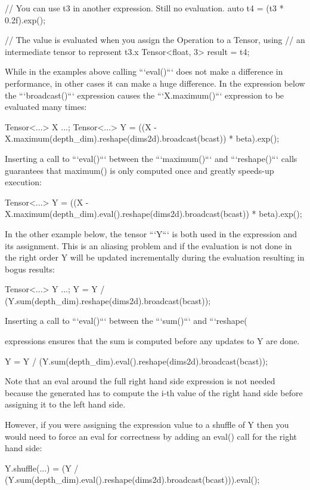 \begin{DoxyCode}
    // You can use t3 in another expression.  Still no evaluation.
    auto t4 = (t3 * 0.2f).exp();

    // The value is evaluated when you assign the Operation to a Tensor, using
    // an intermediate tensor to represent t3.x
    Tensor<float, 3> result = t4;

While in the examples above calling ```eval()``` does not make a difference in
performance, in other cases it can make a huge difference.  In the expression
below the ```broadcast()``` expression causes the ```X.maximum()``` expression
to be evaluated many times:

    Tensor<...> X ...;
    Tensor<...> Y = ((X - X.maximum(depth\_dim).reshape(dims2d).broadcast(bcast))
                     * beta).exp();

Inserting a call to ```eval()``` between the ```maximum()``` and
```reshape()``` calls guarantees that maximum() is only computed once and
greatly speeds-up execution:

    Tensor<...> Y =
      ((X - X.maximum(depth\_dim).eval().reshape(dims2d).broadcast(bcast))
        * beta).exp();

In the other example below, the tensor ```Y``` is both used in the expression
and its assignment.  This is an aliasing problem and if the evaluation is not
done in the right order Y will be updated incrementally during the evaluation
resulting in bogus results:

     Tensor<...> Y ...;
     Y = Y / (Y.sum(depth\_dim).reshape(dims2d).broadcast(bcast));

Inserting a call to ```eval()``` between the ```sum()``` and ```reshape(
\end{DoxyCode}
 expressions ensures that the sum is computed before any updates to {\ttfamily Y} are done. \begin{DoxyVerb} Y = Y / (Y.sum(depth_dim).eval().reshape(dims2d).broadcast(bcast));
\end{DoxyVerb}


Note that an eval around the full right hand side expression is not needed because the generated has to compute the i-\/th value of the right hand side before assigning it to the left hand side.

However, if you were assigning the expression value to a shuffle of {\ttfamily Y} then you would need to force an eval for correctness by adding an {\ttfamily eval()} call for the right hand side\+: \begin{DoxyVerb} Y.shuffle(...) =
    (Y / (Y.sum(depth_dim).eval().reshape(dims2d).broadcast(bcast))).eval();
\end{DoxyVerb}


